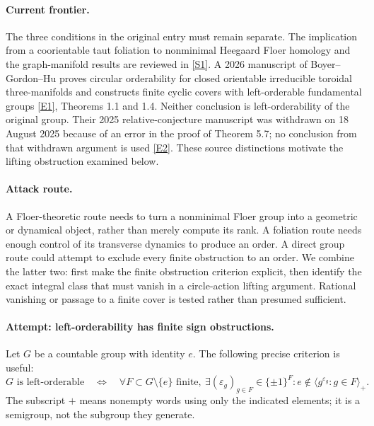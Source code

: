\documentclass[11pt,a4paper]{article}
\newcommand{\eps}{\varepsilon}
\newcommand{\sref}[2]{\hyperlink{source:#1:#2}{[S#2]}}
\newcommand{\eref}[2]{\hyperlink{extra:#1:#2}{[E#2]}}
\numberwithin{equation}{section}
\begin{document}
\paragraph{Current frontier.}
The three conditions in the original entry must remain separate. The
implication from a coorientable taut foliation to nonminimal Heegaard Floer
homology and the graph-manifold results are reviewed in \sref{statement}{1}.
A 2026 manuscript of Boyer--Gordon--Hu proves circular orderability for
closed orientable irreducible toroidal three-manifolds and constructs
finite cyclic covers with left-orderable fundamental groups
\eref{statement}{1}, Theorems 1.1 and 1.4. Neither conclusion is left-orderability
of the original group. Their 2025 relative-conjecture manuscript was
withdrawn on 18 August 2025 because of an error in the proof of Theorem 5.7;
no conclusion from that withdrawn argument is used \eref{statement}{2}.
These source distinctions motivate the lifting obstruction examined below.

\paragraph{Attack route.}
A Floer-theoretic route needs to turn a nonminimal Floer group into a
geometric or dynamical object, rather than merely compute its rank. A
foliation route needs enough control of its transverse dynamics to produce
an order. A direct group route could attempt to exclude every finite
obstruction to an order. We combine the latter two: first make the finite
obstruction criterion explicit, then identify the exact integral class
that must vanish in a circle-action lifting argument. Rational vanishing
or passage to a finite cover is tested rather than presumed sufficient.

\paragraph{Attempt: left-orderability has finite sign obstructions.}
Let $G$ be a countable group with identity $e$. The following precise
criterion is useful:
\begin{equation}\label{eq181-signs}
 G\text{ is left-orderable}\quad\Longleftrightarrow\quad
 \forall F\subset G\setminus\{e\}\text{ finite},\ \exists
 (\eps_g)_{g\in F}\in\{\pm1\}^{F}:
 e\notin\langle g^{\eps_g}:g\in F\rangle_+.
\end{equation}
The subscript $+$ means nonempty words using only the indicated elements;
it is a semigroup, not the subgroup they generate.
\end{document}
